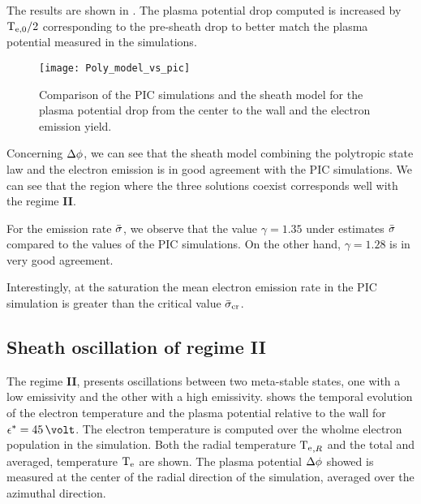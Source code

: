     The results are shown in .
    The plasma potential drop computed is increased by $\mathrm{T_{e, 0}}/2$ corresponding to the pre-sheath drop to better match the plasma potential measured in the simulations.

    \begin{figure}[hbtp]
      \centering
      \texttt{[image: Poly\_model\_vs\_pic]}
      \caption{Comparison of the PIC simulations and the sheath model for the plasma potential drop from the center to the wall and the electron emission yield. }
      \label{fig-Poly_model_vs_pic}
    \end{figure}

    Concerning $\Delta \phi$, we can see that the sheath model combining the polytropic state law and the electron emission is in good agreement with the \ac{PIC} simulations.
    We can see that the region where the three solutions coexist corresponds well with the regime {\bf II}.

    For the emission rate $ \bar{\sigma }$, we observe that the value $\gamma=1.35$ under estimates $ \bar{\sigma }$ compared to the values of the \ac{PIC} simulations.
    On the other hand, $\gamma=1.28$ is in very good agreement.

    Interestingly, at the saturation the mean electron emission rate in the \ac{PIC} simulation is greater than the critical value $ \bar{\sigma }_{\rm cr}$.
    
  \subsection{Sheath oscillation of regime {\bf II}} \label{subsec-pic_scheath_RSO}
  
    The regime {\bf II}, presents oscillations between two meta-stable states, one with a low emissivity and the other with a high emissivity.
     shows the temporal evolution of the electron temperature and the plasma potential relative to the wall for $\crover=45\,\volt$.
    The electron temperature is computed over the wholme electron population in the simulation.
    Both the radial temperature $\mathrm{T_e}_{,R}$ and the total and averaged, temperature $\mathrm{T_e}$ are shown.
    The plasma potential $\Delta \phi$ showed is measured at the center of the radial direction of the simulation, averaged over the azimuthal direction.
    
